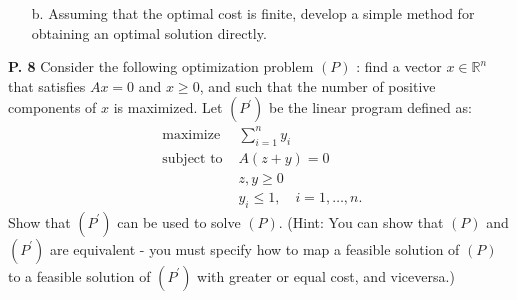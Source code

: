 \documentclass{article}
\begin{document}
\begin{jacklist}
\begin{framed}
\begin{itemize}
        \item [b.] Assuming that the optimal cost is finite, develop a simple method for obtaining an optimal solution directly.
    \end{itemize}
    \end{framed}
\newpage
    \begin{framed} 
    \item [\textbf{P. 8}] Consider the following optimization problem $(P)$ : find a vector $x \in \mathbb{R}^{n}$ that satisfies 
        $A x=0$ and $x \geq 0$, and such that the number of positive components of $x$ is maximized. Let $\left(P^{\prime}\right)$ 
        be the linear program defined as: 
        \[ 
            \begin{aligned}
                \text { maximize } & \sum_{i=1}^{n} y_{i} \\
                \text { subject to } & A(z+y)=0 \\
                & z, y \geq 0 \\
                & y_{i} \leq 1, \quad i=1, \ldots, n .
            \end{aligned}
        \] Show that $\left(P^{\prime}\right)$ can be used to solve $(P)$. (Hint: You can show that $(P)$ and $\left(P^{\prime}\right)$ 
        are equivalent - you must specify how to map a feasible solution of $(P)$ to a feasible solution of 
        $\left(P^{\prime}\right)$ with greater or equal cost, and viceversa.)
    \end{framed}
\end{jacklist}
\end{document}
